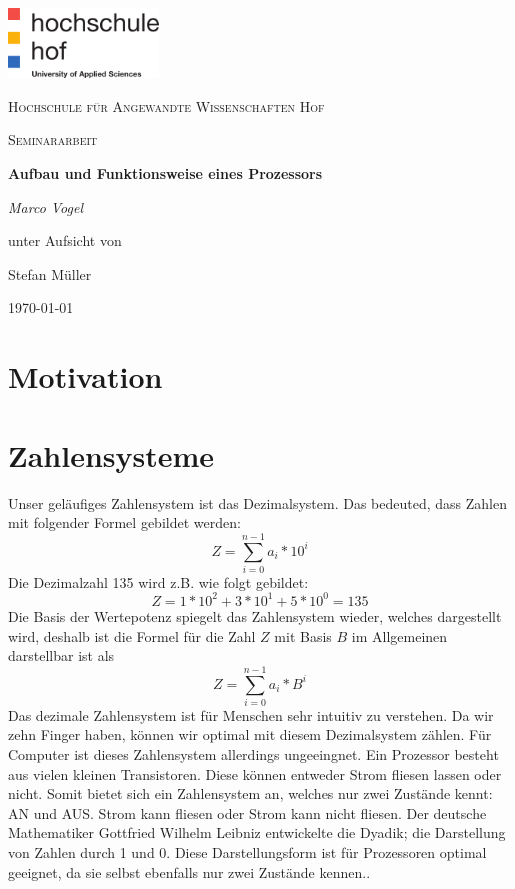 \documentclass[12pt]{article}
\begin{document}
\begin{titlepage}
	\centering
	\includegraphics[width=0.3\textwidth]{logo}\par\vspace{1cm}
	{\scshape\LARGE Hochschule für Angewandte Wissenschaften Hof \par}
	\vspace{1cm}
	{\scshape\Large Seminararbeit\par}
	\vspace{1.5cm}
	{\huge\bfseries Aufbau und Funktionsweise eines Prozessors\par}
	\vspace{2cm}
	{\Large\itshape Marco Vogel\par}
	\vfill
	unter Aufsicht von\par
	Stefan Müller
	\vfill
	{\large\today\par}
\end{titlepage}
\newpage


\tableofcontents
\newpage
\listofcodes




\section{Motivation}
\section{Zahlensysteme}
Unser geläufiges Zahlensystem ist das Dezimalsystem. Das bedeuted, dass Zahlen mit folgender Formel gebildet werden:
$$Z=\sum\limits_{i=0}^{n-1} a_i * 10^i$$
Die Dezimalzahl 135 wird z.B. wie folgt gebildet:$$Z=1*10^2+3*10^1+5*10^0 = 135$$
Die Basis der Wertepotenz spiegelt das Zahlensystem wieder, welches dargestellt wird, deshalb ist die Formel für die Zahl $Z$ mit Basis $B$ im Allgemeinen darstellbar ist als
$$Z=\sum\limits_{i=0}^{n-1} a_i * B^i$$
Das dezimale Zahlensystem ist für Menschen sehr intuitiv zu verstehen. Da wir zehn Finger haben, können wir optimal mit diesem Dezimalsystem zählen. Für Computer ist dieses Zahlensystem allerdings ungeeingnet. Ein Prozessor besteht aus vielen kleinen Transistoren. Diese können entweder Strom fliesen lassen oder nicht. Somit bietet sich ein Zahlensystem an, welches nur zwei Zustände kennt: AN und AUS. Strom kann fliesen oder Strom kann nicht fliesen. Der deutsche Mathematiker Gottfried Wilhelm Leibniz entwickelte die Dyadik; die Darstellung von Zahlen durch 1 und 0. Diese Darstellungsform ist für Prozessoren optimal geeignet, da sie selbst ebenfalls nur zwei Zustände kennen.\cite{wiki:dual}.
\end{document}
